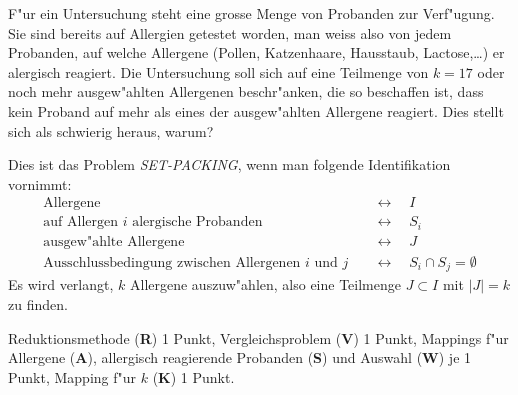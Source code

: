 F"ur ein Untersuchung steht eine grosse Menge von Probanden zur Verf"ugung.
Sie sind bereits auf Allergien getestet worden, man weiss also von jedem
Probanden, auf welche Allergene (Pollen, Katzenhaare, Hausstaub, Lactose,\dots)
er alergisch reagiert.
Die Untersuchung soll sich auf eine Teilmenge von $k=17$ oder noch
mehr ausgew"ahlten
Allergenen beschr"anken, die so beschaffen ist, dass kein Proband auf mehr als 
eines der ausgew"ahlten Allergene reagiert.
Dies stellt sich als schwierig heraus, warum?

\begin{loesung}
Dies ist das Problem {\em SET-PACKING}, wenn man folgende Identifikation
vornimmt:
\begin{align*}
\text{Allergene}                           &\quad\leftrightarrow\quad I\\
\text{auf Allergen $i$ alergische Probanden}&\quad\leftrightarrow\quad S_i\\
\text{ausgew"ahlte Allergene}              &\quad\leftrightarrow\quad J\\
\text{Ausschlussbedingung zwischen Allergenen $i$ und $j$}&\quad\leftrightarrow\quad S_i\cap S_j = \emptyset
\end{align*}
Es wird verlangt, $k$ Allergene auszuw"ahlen, also eine Teilmenge
$J\subset I$ mit $|J|=k$ zu finden.
\end{loesung}

\begin{bewertung}
Reduktionsmethode ({\bf R}) 1 Punkt,
Vergleichsproblem ({\bf V}) 1 Punkt,
Mappings f"ur Allergene ({\bf A}), allergisch reagierende Probanden ({\bf S})
und Auswahl ({\bf W}) je 1 Punkt,
Mapping f"ur $k$ ({\bf K}) 1 Punkt.
\end{bewertung}

